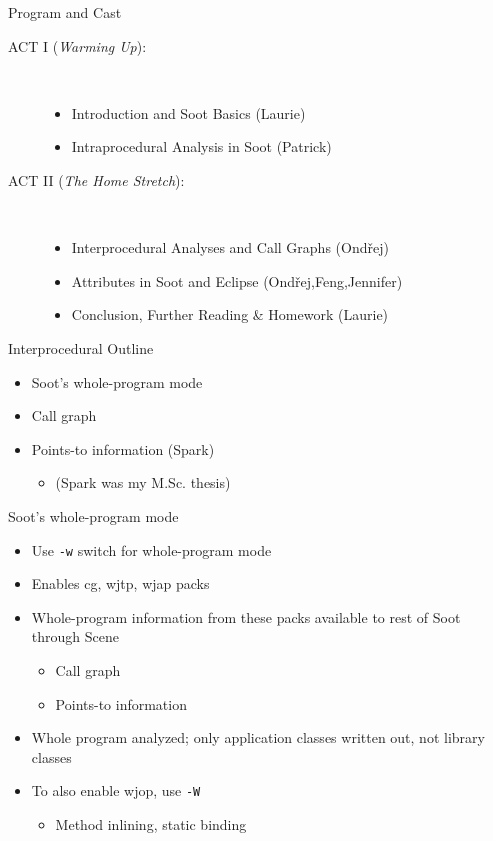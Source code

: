\begin{slide}{Program and Cast}
\begin{description}
\item[ACT I ({\em Warming Up}):] \hspace{1in} \\
\begin{itemize}
\item Introduction and Soot Basics {\blue (Laurie)}
\item Intraprocedural Analysis in Soot {\blue (Patrick)}
\end{itemize}
\item[ACT II ({\em The Home Stretch}):] \hspace{1in} \\
\begin{itemize}
\item {\red Interprocedural Analyses and Call Graphs {\blue (Ond\v{r}ej)}}
\item Attributes in Soot and Eclipse {\blue (Ond\v{r}ej,Feng,Jennifer)}
\item Conclusion, Further Reading \& Homework {\blue (Laurie)}
\end{itemize}
\end{description}
\end{slide}

\begin{slide}{Interprocedural Outline}
\begin{itemize}
\item Soot's whole-program mode
\item Call graph
\item Points-to information (Spark)
\begin{itemize}
\item (Spark was my M.Sc. thesis)
\end{itemize}
\end{itemize}
\end{slide}

\begin{slide}{Soot's whole-program mode}
\begin{itemize}
\item Use \texttt{-w} switch for whole-program mode
\item Enables cg, wjtp, wjap packs
\item Whole-program information from these packs available to rest of Soot through Scene
\begin{itemize}
\item Call graph
\item Points-to information
\end{itemize}
\item Whole program analyzed; only application classes written out, not library classes
\item To also enable wjop, use \texttt{-W}
\begin{itemize}
\item Method inlining, static binding
\end{itemize}
\end{itemize}
\end{slide}





